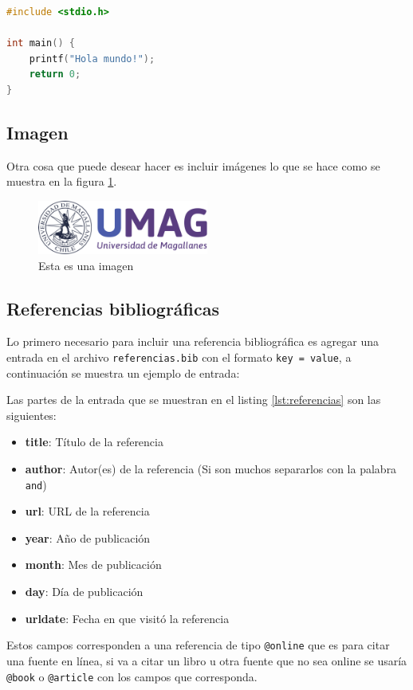 \begin{lstlisting}[style=CodeStyle, language=C, caption={Este es un codigo fuente}, label={lst:codigo}]
#include <stdio.h>

int main() {
    printf("Hola mundo!");
    return 0;
}
\end{lstlisting}

\subsection{Imagen}
Otra cosa que puede desear hacer es incluir imágenes lo que se hace como se muestra en la figura \ref{fig:imagen}.
\begin{figure}[!ht]
    \centering %
    \includegraphics[width=0.5\textwidth]{./src/images/umag.png} %
    \caption{Esta es una imagen} %
    \label{fig:imagen} %
\end{figure}

\subsection{Referencias bibliográficas}
Lo primero necesario para incluir una referencia bibliográfica es agregar una entrada en el archivo \texttt{referencias.bib} con el formato \texttt{key = value}, a continuación se muestra un ejemplo de entrada:


Las partes de la entrada que se muestran en el listing \ref{lst:referencias} son las siguientes:
\begin{itemize}
    \item \textbf{title}: Título de la referencia
    \item \textbf{author}: Autor(es) de la referencia (Si son muchos separarlos con la palabra \texttt{and})
    \item \textbf{url}: URL de la referencia
    \item \textbf{year}: Año de publicación
    \item \textbf{month}: Mes de publicación
    \item \textbf{day}: Día de publicación
    \item \textbf{urldate}: Fecha en que visitó la referencia
\end{itemize}
Estos campos corresponden a una referencia de tipo \texttt{@online} que es para citar una fuente en línea, si va a citar un libro u otra fuente que no sea online se usaría \texttt{@book} o \texttt{@article} con los campos que corresponda.

